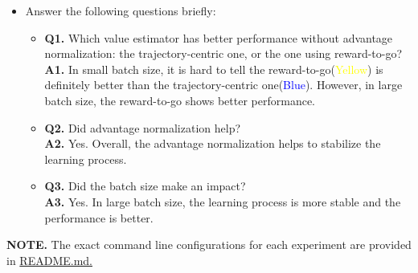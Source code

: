 \documentclass{article}
\begin{document}
\begin{itemize}
\item Answer the following questions briefly: 
    \begin{itemize}
    \item \textbf{Q1.} Which value estimator has better performance without advantage normalization: the trajectory-centric one, or the one using reward-to-go? \\
    \textbf{A1.} In small batch size, it is hard to tell the reward-to-go(\textcolor{yellow}{Yellow}) is definitely better than the trajectory-centric one(\textcolor{blue}{Blue}). However, in large batch size, the reward-to-go shows better performance.
    \item \textbf{Q2.} Did advantage normalization help? \\
    \textbf{A2.} Yes. Overall, the advantage normalization helps to stabilize the learning process.
    \item \textbf{Q3.} Did the batch size make an impact? \\
    \textbf{A3.} Yes. In large batch size, the learning process is more stable and the performance is better.
    \end{itemize}
\end{itemize}
\textbf{NOTE.} The exact command line configurations for each experiment are provided in \href{https://github.com/ChanJoon/CS285_hw_fall2023/tree/main/hw2/README.md}{README.md.}
\end{document}
